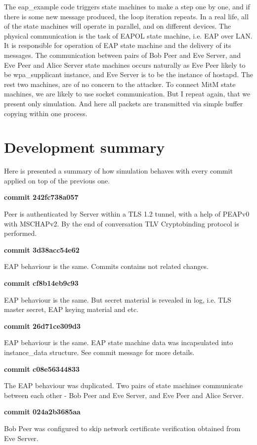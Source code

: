 \documentclass{extarticle}
\begin{document}
The eap\_example code triggers state machines to make a step one by one,
and if there is some new message produced, the loop iteration repeats.
In a real life, all of the state machines will operate in parallel,
and on different devices.
The physical communication is the task of EAPOL state machine,
i.e. EAP over LAN.
It is responsible for operation of EAP state machine and the delivery
of its messages.
The communication between pairs of Bob Peer and Eve Server,
and Eve Peer and Alice Server state machines occurs naturally
as Eve Peer likely to be wpa\_supplicant instance, and Eve Server is to be the
instance of hostapd.
The rest two machines, are of no concern to the attacker.
To connect MitM state machines, we are likely to use socket communication.
But I repeat again, that we present only simulation.
And here all packets are transmitted via simple buffer copying within one process.

\section{Development summary}

Here is presented a summary of how simulation behaves
with every commit applied on top of the previous one.

\textbf{commit 242fc738a057}

Peer is authenticated by Server within a TLS 1.2 tunnel,
with a help of PEAPv0 with MSCHAPv2. By the end of conversation
TLV Cryptobinding protocol is performed.

\textbf{commit 3d38acc54e62}

EAP behaviour is the same. Commits contains not related changes.

\textbf{commit cf8b14eb9c93}

EAP behaviour is the same. But secret material is revealed in log,
i.e. TLS master secret, EAP keying material and etc.

\textbf{commit 26d71ce309d3}

EAP behaviour is the same. EAP state machine data was incapsulated
into instance\_data structure. See commit message for more details.

\textbf{commit c08e56344833}

The EAP behaviour was duplicated. Two pairs of state machines
communicate between each other - Bob Peer and Eve Server,
and Eve Peer and Alice Server.

\textbf{commit 024a2b3685aa}

Bob Peer was configured to skip network certificate verification
obtained from Eve Server.
\end{document}
